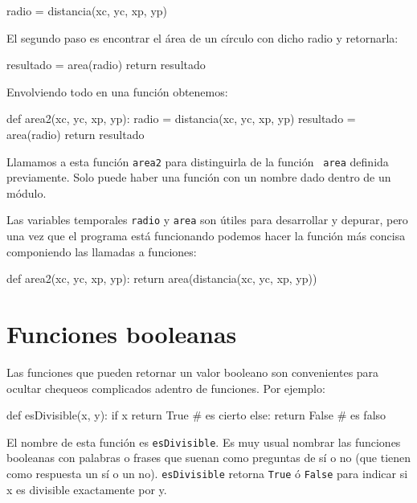 \beforeverb
\begin{pythoncode}
radio = distancia(xc, yc, xp, yp)
\end{pythoncode}
\afterverb
%

El segundo paso es encontrar el área de un círculo con dicho radio y 
retornarla:

\beforeverb
\begin{pythoncode}
resultado = area(radio)
return resultado
\end{pythoncode}
\afterverb
%

Envolviendo todo en una función obtenemos:

\beforeverb
\begin{pythoncode}
def area2(xc, yc, xp, yp):
  radio = distancia(xc, yc, xp, yp)
  resultado = area(radio)
  return resultado
\end{pythoncode}
\afterverb
%

Llamamos a esta función \texttt{area2} para distinguirla de la función {\tt
area} definida previamente.  Solo puede haber una función con un nombre
dado dentro de un módulo.

Las variables temporales \texttt{radio} y \texttt{area} son útiles para
desarrollar y depurar, pero una vez que el programa está funcionando
podemos hacer la función más concisa componiendo las llamadas a
funciones:

\beforeverb
\begin{pythoncode}
def area2(xc, yc, xp, yp):
  return area(distancia(xc, yc, xp, yp))
\end{pythoncode}
\afterverb
%


\section{Funciones booleanas}
\label{boolean}

Las funciones que pueden retornar un valor booleano son convenientes para
ocultar chequeos complicados adentro de funciones. Por ejemplo:

\beforeverb
\begin{pythoncode}
def esDivisible(x, y):
  if x %
    return True       #  es cierto
  else:
    return False      # es falso
\end{pythoncode}
\afterverb
%

El nombre de esta función es \texttt{esDivisible}.  Es muy usual nombrar
las funciones booleanas con palabras o frases que suenan como preguntas de sí o 
no (que tienen como respuesta un sí o un no).  {\tt esDivisible} retorna  
\texttt{True} ó \texttt{False} para indicar si x es divisible exactamente por y.

